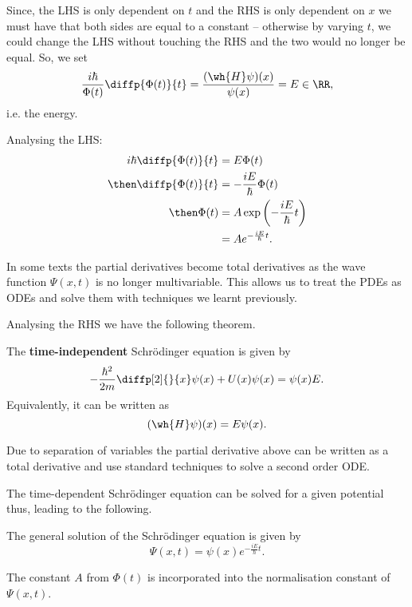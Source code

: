 \documentclass[12pt, a4paper]{article}
\begin{document}
Since, the LHS is only dependent on \(t\) and the RHS is only dependent on \(x\) we must have that both sides are equal to a constant -- otherwise by varying \(t\), we could change the LHS without touching the RHS and the two would no longer be equal. So, we set 
\[\frac{i \hbar}{\Phi(t)} \diffp{\Phi(t)}{t} = \frac{(\wh{H}\psi)(x)}{\psi(x)} = E \in \RR,\]
i.e. the energy.

Analysing the LHS:
\[\begin{aligned}
    i \hbar \diffp{\Phi(t)}{t} &= E \Phi(t) \\
    \then \diffp{\Phi(t)}{t} &= -\frac{iE}{\hbar} \Phi(t) \\
    \then  \Phi(t) &= A \exp\left( -\frac{iE}{\hbar} t\right) \\
    &= Ae^{-\frac{iE}{\hbar} t}.
\end{aligned}\]

\begin{mdremark}
    In some texts the partial derivatives become total derivatives as the wave function \(\Psi(x,t)\) is no longer multivariable. This allows us to treat the PDEs as ODEs and solve them with techniques we learnt previously.
\end{mdremark}

Analysing the RHS we have the following theorem.

\begin{mdthm}
    The \textbf{time-independent} Schrödinger equation is given by 
    \[- \frac{\hbar^2}{2m} \diffp[2]{}{x}\psi(x)+U(x)\psi(x)=\psi(x)E.\]
    Equivalently, it can be written as 
    \[(\wh{H}\psi)(x)=E\psi(x).\]
\end{mdthm}

\begin{mdnote}
    Due to separation of variables the partial derivative above can be written as a total derivative and use standard techniques to solve a second order ODE.
\end{mdnote}

The time-dependent Schrödinger equation can be solved for a given potential thus, leading to the following.

\begin{mdcor}
    The general solution of the Schrödinger equation is given by 
    \[\Psi(x,t) = \psi(x) e^{ -\frac{iE}{\hbar} t}.\]
\end{mdcor}

\begin{mdremark}
    The constant \(A\) from \(\Phi(t)\) is incorporated into the normalisation constant of \(\Psi(x,t)\).
\end{mdremark}
\end{document}
